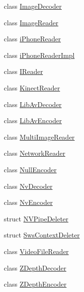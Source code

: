 \begin{DoxyCompactItemize}
\item 
class \hyperlink{classmoetsi_1_1ssp_1_1ImageDecoder}{Image\+Decoder}
\item 
class \hyperlink{classmoetsi_1_1ssp_1_1ImageReader}{Image\+Reader}
\item 
class \hyperlink{classmoetsi_1_1ssp_1_1iPhoneReader}{i\+Phone\+Reader}
\item 
class \hyperlink{classmoetsi_1_1ssp_1_1iPhoneReaderImpl}{i\+Phone\+Reader\+Impl}
\item 
class \hyperlink{classmoetsi_1_1ssp_1_1IReader}{I\+Reader}
\item 
class \hyperlink{classmoetsi_1_1ssp_1_1KinectReader}{Kinect\+Reader}
\item 
class \hyperlink{classmoetsi_1_1ssp_1_1LibAvDecoder}{Lib\+Av\+Decoder}
\item 
class \hyperlink{classmoetsi_1_1ssp_1_1LibAvEncoder}{Lib\+Av\+Encoder}
\item 
class \hyperlink{classmoetsi_1_1ssp_1_1MultiImageReader}{Multi\+Image\+Reader}
\item 
class \hyperlink{classmoetsi_1_1ssp_1_1NetworkReader}{Network\+Reader}
\item 
class \hyperlink{classmoetsi_1_1ssp_1_1NullEncoder}{Null\+Encoder}
\item 
class \hyperlink{classmoetsi_1_1ssp_1_1NvDecoder}{Nv\+Decoder}
\item 
class \hyperlink{classmoetsi_1_1ssp_1_1NvEncoder}{Nv\+Encoder}
\item 
struct \hyperlink{structmoetsi_1_1ssp_1_1NVPipeDeleter}{N\+V\+Pipe\+Deleter}
\item 
struct \hyperlink{structmoetsi_1_1ssp_1_1SwsContextDeleter}{Sws\+Context\+Deleter}
\item 
class \hyperlink{classmoetsi_1_1ssp_1_1VideoFileReader}{Video\+File\+Reader}
\item 
class \hyperlink{classmoetsi_1_1ssp_1_1ZDepthDecoder}{Z\+Depth\+Decoder}
\item 
class \hyperlink{classmoetsi_1_1ssp_1_1ZDepthEncoder}{Z\+Depth\+Encoder}
\end{DoxyCompactItemize}
